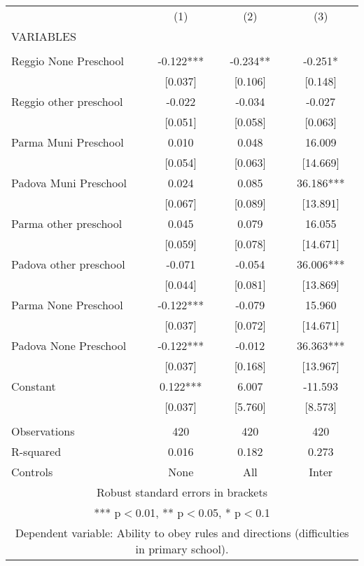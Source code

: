 \begin{tabular}{lccc} \hline
 & (1) & (2) & (3) \\
VARIABLES &  &  &  \\ \hline
 &  &  &  \\
Reggio None Preschool & -0.122*** & -0.234** & -0.251* \\
 & [0.037] & [0.106] & [0.148] \\
Reggio other preschool & -0.022 & -0.034 & -0.027 \\
 & [0.051] & [0.058] & [0.063] \\
Parma Muni Preschool & 0.010 & 0.048 & 16.009 \\
 & [0.054] & [0.063] & [14.669] \\
Padova Muni Preschool & 0.024 & 0.085 & 36.186*** \\
 & [0.067] & [0.089] & [13.891] \\
Parma other preschool & 0.045 & 0.079 & 16.055 \\
 & [0.059] & [0.078] & [14.671] \\
Padova other preschool & -0.071 & -0.054 & 36.006*** \\
 & [0.044] & [0.081] & [13.869] \\
Parma None Preschool & -0.122*** & -0.079 & 15.960 \\
 & [0.037] & [0.072] & [14.671] \\
Padova None Preschool & -0.122*** & -0.012 & 36.363*** \\
 & [0.037] & [0.168] & [13.967] \\
Constant & 0.122*** & 6.007 & -11.593 \\
 & [0.037] & [5.760] & [8.573] \\
 &  &  &  \\
Observations & 420 & 420 & 420 \\
R-squared & 0.016 & 0.182 & 0.273 \\
 Controls & None & All & Inter \\ \hline
\multicolumn{4}{c}{ Robust standard errors in brackets} \\
\multicolumn{4}{c}{ *** p$<$0.01, ** p$<$0.05, * p$<$0.1} \\
\multicolumn{4}{c}{ Dependent variable: Ability to obey rules and directions (difficulties in primary school).} \\
\end{tabular}

